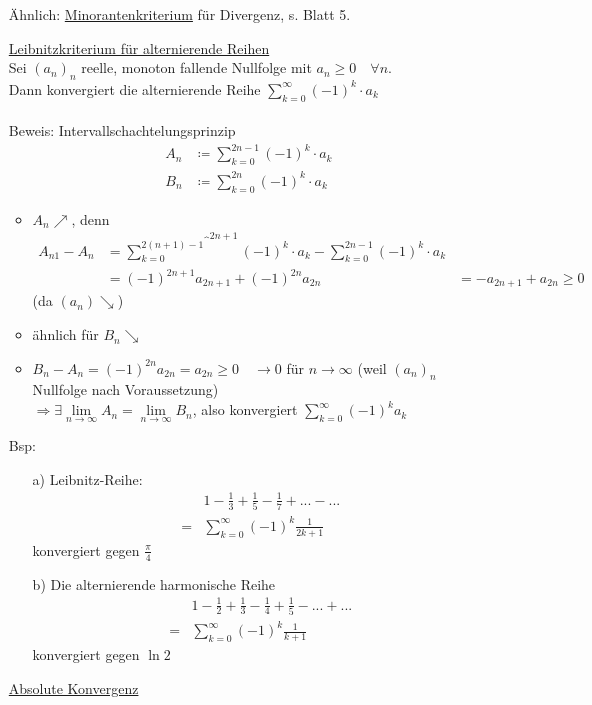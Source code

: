\documentclass[12pt, titlepage]{article}
\newcommand{\infn}{n\rightarrow\infty}
\renewcommand{\>}{\rightarrow}
\renewcommand{\*}{\cdot}
\begin{document}
\begin{itemize}
		Ähnlich: \underline{Minorantenkriterium} für Divergenz, s. Blatt 5.
		\item[\fbox{5}] \underline{Leibnitzkriterium für alternierende Reihen}\\
		Sei $(a_n)_n$ reelle, monoton fallende Nullfolge mit $a_n\geq0\quad\forall n$.\\
		Dann konvergiert die alternierende Reihe $\sum_{k=0}^{\infty}(-1)^k\*a_k$\\
		\\
		Beweis: Intervallschachtelungsprinzip
		\begin{align*}
			A_n&\coloneqq\sum_{k=0}^{2n-1}(-1)^k\*a_k\\
			B_n&\coloneqq\sum_{k=0}^{2n}(-1)^k\*a_k
		\end{align*}
	\begin{itemize}
		\item $A_n\nearrow$, denn
		\begin{align*}
			A_{n1}-A_n & =\overbrace{\sum_{k=0}^{2(n+1)-1}}^{2n+1}(-1)^k\*a_k-\sum_{k=0}^{2n-1}(-1)^k\*a_k &  \\
			           & =(-1)^{2n+1}a_{2n+1}+(-1)^{2n}a_{2n}                                              & =-a_{2n+1}+a_{2n}\geq 0
		\end{align*}
		(da $(a_n)\searrow$)
		\item ähnlich für $B_n\searrow$
		\item $B_n-A_n=(-1)^{2n}a_{2n}=a_{2n}\geq0\quad\longrightarrow0$ für $\infn$ (weil $(a_n)_n$ Nullfolge nach Voraussetzung)\\
		$\Rightarrow\exists\lim\limits_{\infn}A_n=\lim\limits_{\infn}B_n$, also konvergiert $\sum_{k=0}^{\infty}(-1)^ka_k$
	\end{itemize}
	Bsp:
	\begin{itemize}
		\item[a)] Leibnitz-Reihe:
		\begin{align*}
			&1-\frac{1}{3}+\frac{1}{5}-\frac{1}{7}+...-...\\
			=&\sum_{k=0}^{\infty}(-1)^k\frac{1}{2k+1}
		\end{align*}
		konvergiert gegen $\frac{\pi}{4}$
		\item[b)] Die alternierende harmonische Reihe
		\begin{align*}
			&1-\frac{1}{2}+\frac{1}{3}-\frac{1}{4}+\frac{1}{5}-...+...\\
			=&\sum_{k=0}^{\infty}(-1)^k\frac{1}{k+1}
		\end{align*}
		konvergiert gegen $\ln2$
	\end{itemize}
	\item[\fbox{6}] \underline{Absolute Konvergenz}

\end{itemize}
\end{document}
